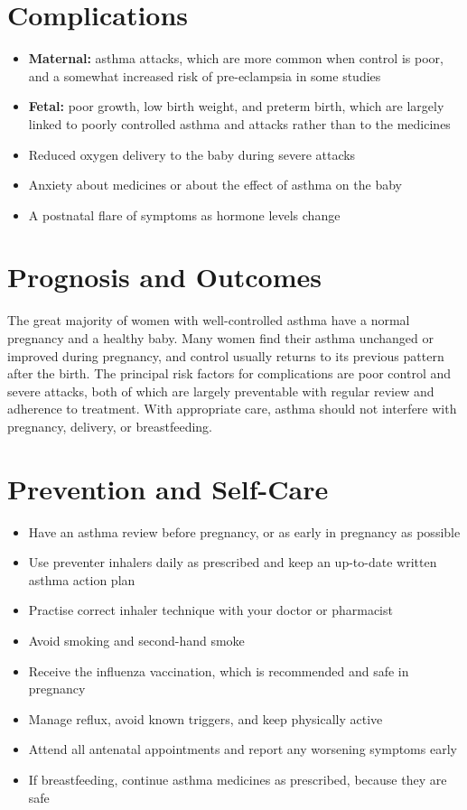 \section*{Complications}
\begin{itemize}
    \item \textbf{Maternal:} asthma attacks, which are more common when control is poor, and a somewhat increased risk of pre-eclampsia in some studies
    \item \textbf{Fetal:} poor growth, low birth weight, and preterm birth, which are largely linked to poorly controlled asthma and attacks rather than to the medicines
    \item Reduced oxygen delivery to the baby during severe attacks
    \item Anxiety about medicines or about the effect of asthma on the baby
    \item A postnatal flare of symptoms as hormone levels change
\end{itemize}

\section*{Prognosis and Outcomes}
The great majority of women with well-controlled asthma have a normal pregnancy and a healthy baby. Many women find their asthma unchanged or improved during pregnancy, and control usually returns to its previous pattern after the birth. The principal risk factors for complications are poor control and severe attacks, both of which are largely preventable with regular review and adherence to treatment. With appropriate care, asthma should not interfere with pregnancy, delivery, or breastfeeding.

\section*{Prevention and Self-Care}
\begin{itemize}
    \item Have an asthma review before pregnancy, or as early in pregnancy as possible
    \item Use preventer inhalers daily as prescribed and keep an up-to-date written asthma action plan
    \item Practise correct inhaler technique with your doctor or pharmacist
    \item Avoid smoking and second-hand smoke
    \item Receive the influenza vaccination, which is recommended and safe in pregnancy
    \item Manage reflux, avoid known triggers, and keep physically active
    \item Attend all antenatal appointments and report any worsening symptoms early
    \item If breastfeeding, continue asthma medicines as prescribed, because they are safe
\end{itemize}

